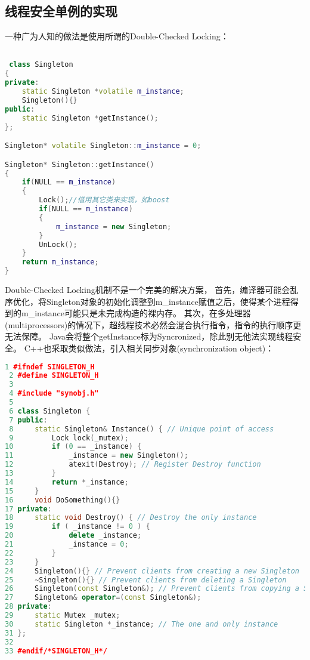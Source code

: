 \subsection{线程安全单例的实现}
一种广为人知的做法是使用所谓的Double-Checked Locking：

\begin{lstlisting}[language=C++]                      

 class Singleton
{
private:
    static Singleton *volatile m_instance;
    Singleton(){}
public:
    static Singleton *getInstance();
};

Singleton* volatile Singleton::m_instance = 0;

Singleton* Singleton::getInstance()
{
    if(NULL == m_instance)
    {
        Lock();//借用其它类来实现，如boost
        if(NULL == m_instance)
        {
            m_instance = new Singleton;
        }
        UnLock();
    }
    return m_instance;
} 
\end{lstlisting}

Double-Checked Locking机制不是一个完美的解决方案，
首先，编译器可能会乱序优化，将Singleton对象的初始化调整到m\_instance赋值之后，使得某个进程得到的m\_instance可能只是未完成构造的裸内存。
其次，在多处理器(multiprocessors)的情况下，超线程技术必然会混合执行指令，指令的执行顺序更无法保障。
Java会将整个getInstance标为Syncronized，除此别无他法实现线程安全。
C++也采取类似做法，引入相关同步对象(synchronization object)：
\begin{lstlisting}[language=C++]                      
1 #ifndef SINGLETON_H
 2 #define SINGLETON_H
 3 
 4 #include "synobj.h"
 5 
 6 class Singleton {
 7 public:
 8     static Singleton& Instance() { // Unique point of access
 9         Lock lock(_mutex);
10         if (0 == _instance) {
11             _instance = new Singleton();
12             atexit(Destroy); // Register Destroy function
13         }
14         return *_instance;
15     }
16     void DoSomething(){}
17 private:
18     static void Destroy() { // Destroy the only instance
19         if ( _instance != 0 ) {
20             delete _instance;
21             _instance = 0;
22         }
23     }
24     Singleton(){} // Prevent clients from creating a new Singleton
25     ~Singleton(){} // Prevent clients from deleting a Singleton
26     Singleton(const Singleton&); // Prevent clients from copying a Singleton
27     Singleton& operator=(const Singleton&);
28 private:
29     static Mutex _mutex;
30     static Singleton *_instance; // The one and only instance
31 };
32 
33 #endif/*SINGLETON_H*/
\end{lstlisting}



